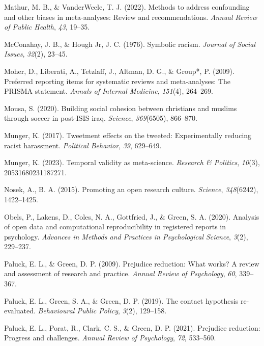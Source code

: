 \documentclass[
  man]{apa6}
\newlength{\cslhangindent}
\newenvironment{CSLReferences}[2] %
 {\begin{list}{}{%
  \setlength{\itemindent}{0pt}
  \setlength{\leftmargin}{0pt}
  \setlength{\parsep}{0pt}
  \ifodd #1
   \setlength{\leftmargin}{\cslhangindent}
   \setlength{\itemindent}{-1\cslhangindent}
  \fi
  \setlength{\itemsep}{#2\baselineskip}}}
 {\end{list}}
\begin{document}
\begin{CSLReferences}{1}{0}
Mathur, M. B., \& VanderWeele, T. J. (2022). Methods to address confounding and other biases in meta-analyses: Review and recommendations. \emph{Annual Review of Public Health}, \emph{43}, 19--35.

McConahay, J. B., \& Hough Jr, J. C. (1976). Symbolic racism. \emph{Journal of Social Issues}, \emph{32}(2), 23--45.

Moher, D., Liberati, A., Tetzlaff, J., Altman, D. G., \& Group*, P. (2009). Preferred reporting items for systematic reviews and meta-analyses: The PRISMA statement. \emph{Annals of Internal Medicine}, \emph{151}(4), 264--269.

Mousa, S. (2020). Building social cohesion between christians and muslims through soccer in post-ISIS iraq. \emph{Science}, \emph{369}(6505), 866--870.

Munger, K. (2017). Tweetment effects on the tweeted: Experimentally reducing racist harassment. \emph{Political Behavior}, \emph{39}, 629--649.

Munger, K. (2023). Temporal validity as meta-science. \emph{Research \& Politics}, \emph{10}(3), 20531680231187271.

Nosek, A., B. A. (2015). Promoting an open research culture. \emph{Science}, \emph{348}(6242), 1422--1425.

Obels, P., Lakens, D., Coles, N. A., Gottfried, J., \& Green, S. A. (2020). Analysis of open data and computational reproducibility in registered reports in psychology. \emph{Advances in Methods and Practices in Psychological Science}, \emph{3}(2), 229--237.

Paluck, E. L., \& Green, D. P. (2009). Prejudice reduction: What works? A review and assessment of research and practice. \emph{Annual Review of Psychology}, \emph{60}, 339--367.

Paluck, E. L., Green, S. A., \& Green, D. P. (2019). The contact hypothesis re-evaluated. \emph{Behavioural Public Policy}, \emph{3}(2), 129--158.

Paluck, E. L., Porat, R., Clark, C. S., \& Green, D. P. (2021). Prejudice reduction: Progress and challenges. \emph{Annual Review of Psychology}, \emph{72}, 533--560.


\end{CSLReferences}
\end{document}
